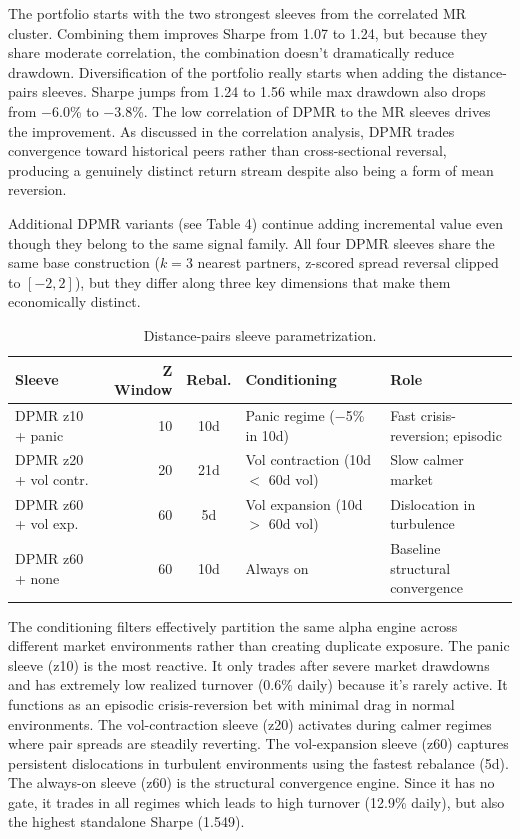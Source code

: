 \documentclass{article}
\begin{document}
The portfolio starts with the two strongest sleeves from the correlated MR cluster. Combining them improves Sharpe from 1.07 to 1.24, but because they share moderate correlation, the combination doesn't dramatically reduce drawdown. Diversification of the portfolio really starts when adding the distance-pairs sleeves. Sharpe jumps from 1.24 to 1.56 while max drawdown also drops from $-$6.0\% to $-$3.8\%. The low correlation of DPMR to the MR sleeves drives the improvement. As discussed in the correlation analysis, DPMR trades convergence toward historical peers rather than cross-sectional reversal, producing a genuinely distinct return stream despite also being a form of mean reversion.

Additional DPMR variants (see Table 4) continue adding incremental value even though they belong to the same signal family. All four DPMR sleeves share the same base construction ($k=3$ nearest partners, z-scored spread reversal clipped to $[-2, 2]$), but they differ along three key dimensions that make them economically distinct.

\begin{table}[htbp]
    \centering
    \small
    \begin{tabular}{lrcll}
        \toprule
        Sleeve & Z Window & Rebal. & Conditioning & Role \\
        \midrule
        DPMR z10 + panic & 10 & 10d & Panic regime ($-$5\% in 10d) & Fast crisis-reversion; episodic \\
        DPMR z20 + vol contr. & 20 & 21d & Vol contraction (10d $<$ 60d vol) & Slow calmer market \\
        DPMR z60 + vol exp. & 60 & 5d & Vol expansion (10d $>$ 60d vol) & Dislocation in turbulence \\
        DPMR z60 + none & 60 & 10d & Always on & Baseline structural convergence \\
        \bottomrule
    \end{tabular}
    \caption{Distance-pairs sleeve parametrization.}
    \label{tab:dpmr-sleeves}
\end{table}

The conditioning filters effectively partition the same alpha engine across different market environments rather than creating duplicate exposure. The panic sleeve (z10) is the most reactive. It only trades after severe market drawdowns and has extremely low realized turnover (0.6\% daily) because it's rarely active. It functions as an episodic crisis-reversion bet with minimal drag in normal environments. The vol-contraction sleeve (z20) activates during calmer regimes where pair spreads are steadily reverting. The vol-expansion sleeve (z60) captures persistent dislocations in turbulent environments using the fastest rebalance (5d). The always-on sleeve (z60) is the structural convergence engine. Since it has no gate, it trades in all regimes which leads to high turnover (12.9\% daily), but also the highest standalone Sharpe (1.549).
\end{document}
